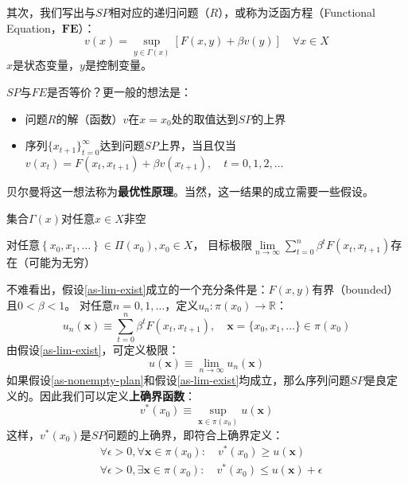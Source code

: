 其次，我们写出与$SP$相对应的递归问题（$R$），或称为泛函方程（Functional Equation，$\mathbf{FE}$）：
$$
v(x)=\sup _{y \in \Gamma(x)}[F(x, y)+\beta v(y)] \quad \forall x \in X
$$
$x$是状态变量，$y$是控制变量。

$SP$与$FE$是否等价？更一般的想法是：
\begin{itemize}
    \item 问题$R$的解（函数）$v$在$x=x_0$处的取值达到$SP$的上界
    \item 序列$\{x_{t+1}\}_{t=0}^{\infty}$达到问题$SP$上界，当且仅当
        $v\left(x_t\right)=F\left(x_t, x_{t+1}\right)+\beta v\left(x_{t+1}\right), \quad t=0,1,2, \ldots$
\end{itemize}

贝尔曼将这一想法称为\textbf{最优性原理}。当然，这一结果的成立需要一些假设。
\begin{assumption} \label{as-nonempty-plan}
    集合$\Gamma\left(x\right)$对任意$x\in X$非空
\end{assumption}
\begin{assumption} \label{as-lim-exist}
    对任意$\left\{x_0, x_1, \ldots\right\} \in \Pi\left(x_0\right), x_0 \in X$，
        目标极限$\lim\limits_{n\rightarrow \infty}\sum_{t=0}^{n}\beta^t F\left(x_t,x_{t+1}\right)$存在（可能为无穷）
\end{assumption}
不难看出，假设\ref{as-lim-exist}成立的一个充分条件是：$F\left(x,y\right)$有界（bounded）且$0<\beta<1$。
对任意$n=0,1,\dots$，定义$u_n: \pi\left(x_0\right)\rightarrow \mathbb{R}$：
$$
u_n(\boldsymbol{x}) \equiv \sum_{t=0}^n \beta^t F\left(x_t, x_{t+1}\right), \quad \boldsymbol{x}=\{x_0,x_1,\dots\} \in \pi\left(x_0\right)
$$
由假设\ref{as-lim-exist}，可定义极限：
\begin{equation*}
    u\left(\boldsymbol{x}\right) \equiv \lim _{n\rightarrow\infty}u_n\left(\boldsymbol{x}\right)
\end{equation*}
如果假设\ref{as-nonempty-plan}和假设\ref{as-lim-exist}均成立，那么序列问题$SP$是良定义的。因此我们可以定义\textbf{上确界函数}：
\begin{equation*}
    v^*\left(x_0\right)\equiv \sup _{\boldsymbol{x}\in\pi\left(x_0\right)} u\left(\boldsymbol{x}\right)
\end{equation*}
这样，$v^*\left(x_0\right)$是$SP$问题的上确界，即符合上确界定义：
\begin{equation*}
    \begin{aligned}
        &\forall \epsilon > 0, \forall \boldsymbol{x}\in \pi\left(x_0\right): \quad v^*\left(x_0\right)\geq u\left(\boldsymbol{x}\right) \\
        &\forall \epsilon > 0, \exists \boldsymbol{x}\in\pi\left(x_0\right): \quad v^*\left(x_0\right)\leq u\left(\boldsymbol{x}\right)+\epsilon
    \end{aligned}
\end{equation*}

